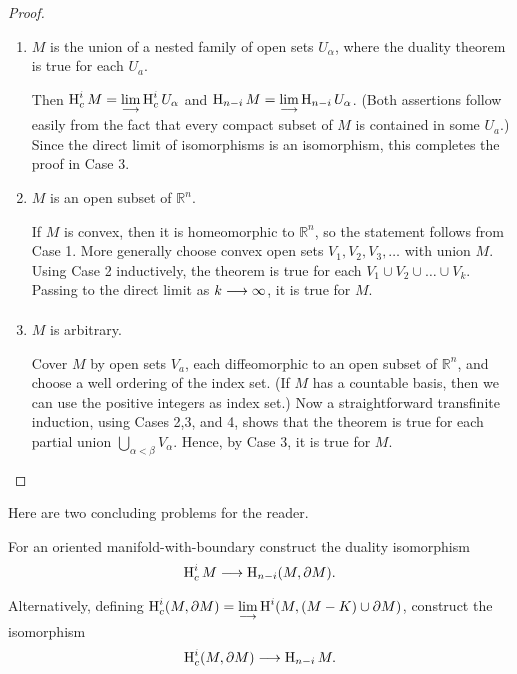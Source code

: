 \documentclass[../main]{subfiles}
\begin{document}
\begin{proof}
\begin{enumerate}[label = Case \arabic*.]
    Applying the Five Lemma to the resulting diagram, this completes the proof in Case $2 .$
    
    \item $M$ is the union of a nested family of open sets $U_{\alpha}$, where the duality theorem is true for each $U_{a}$.

    Then $\operatorname{H}_{c}^i M =\displaystyle \lim_{\longrightarrow} \operatorname{H}_{c}^i U_{\alpha}$ and $\operatorname{H}_{n-i}M = \displaystyle \lim_{\longrightarrow} \operatorname{H}_{n-i}U_{\alpha}$.  (Both assertions follow easily from the fact that every compact subset of $M$ is contained in some $U _{a} .$) Since the direct limit of isomorphisms is an isomorphism, this completes the proof in Case $3 .$
    
    \item $M$ is an open subset of $\mathbb{R}^{n}$.

    If $M$ is convex, then it is homeomorphic to $\mathbb{R}^{n}$, so the statement follows from Case 1. More generally choose convex open sets $V_{1}, V_{2}, V_{3}, \ldots$ with union $M$. Using Case 2 inductively, the theorem is true for each $V_{1} \cup V_{2} \cup \ldots \cup V_{k}$. Passing to the direct limit as $k \varrightarrow{} \infty$, it is true for $M$.
    
    \item  $M$ is arbitrary.

    Cover $M$ by open sets $V_{a}$, each diffeomorphic to an open subset of $\mathbb{R}^{n}$, and choose a well ordering of the index set. (If $M$ has a countable basis, then we can use the positive integers as index set.) Now a straightforward transfinite induction, using Cases 2,3, and 4, shows that the theorem is true for each partial union $\bigcup_{\alpha<\beta} V_{\alpha}$. Hence, by Case 3, it is true for $M$.
\end{enumerate}
\end{proof}

Here are two concluding problems for the reader.

\begin{problem}\label{prob:A.1}
For an oriented manifold-with-boundary construct the duality isomorphism
\[
\homology_{c}^{i} M \varrightarrow{}  \homology_{n-i}(M, \partial M).
\]
Alternatively, defining $\operatorname{H}_{c}^{i}(M, \partial M)=\displaystyle\lim_{\longrightarrow} \operatorname{H}^{i}(M,(M-K) \cup \partial M)$, construct the isomorphism
\[
\homology_{c}^{i}(M, \partial M) \varrightarrow{} \homology_{n-i} M.
\]
\end{problem}
\end{document}
